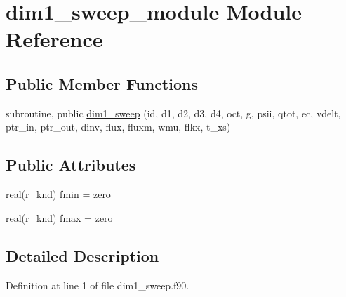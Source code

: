 \hypertarget{classdim1__sweep__module}{\section{dim1\-\_\-sweep\-\_\-module Module Reference}
\label{classdim1__sweep__module}
}
\subsection*{Public Member Functions}
\begin{DoxyCompactItemize}
\item 
subroutine, public \hyperlink{classdim1__sweep__module_aa0a270b2504bf7da636d3b3eaecdea16}{dim1\-\_\-sweep} (id, d1, d2, d3, d4, oct, g, psii, qtot, ec, vdelt, ptr\-\_\-in, ptr\-\_\-out, dinv, flux, fluxm, wmu, flkx, t\-\_\-xs)
\end{DoxyCompactItemize}
\subsection*{Public Attributes}
\begin{DoxyCompactItemize}
\item 
real(r\-\_\-knd) \hyperlink{classdim1__sweep__module_a9b0ce6702181b5c9bf98ac179929a1aa}{fmin} = zero
\item 
real(r\-\_\-knd) \hyperlink{classdim1__sweep__module_a973f03dda9d8fe7662d437c0c790f3a2}{fmax} = zero
\end{DoxyCompactItemize}


\subsection{Detailed Description}


Definition at line 1 of file dim1\-\_\-sweep.\-f90.



